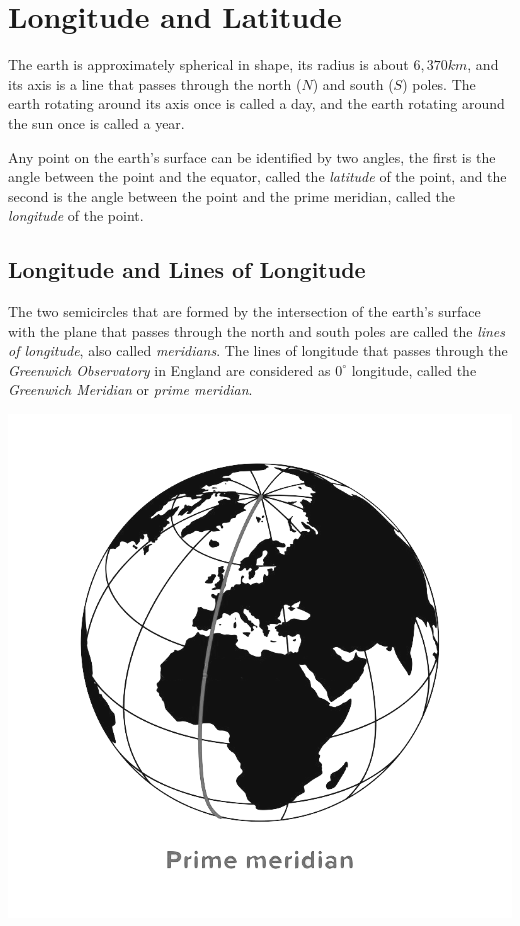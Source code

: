 \documentclass{report}
\begin{document}
\begin{multicols}{2}
\begin{enumerate}
    \end{enumerate}

    \section{Longitude and Latitude}

    The earth is approximately spherical in shape, its radius is about $6,370km$,
    and its axis is a line that passes through the north ({$N$}) and south ($S$)
    poles. The earth rotating around its axis once is called a day, and the earth
    rotating around the sun once is called a year.

    Any point on the earth's surface can be identified by two angles, the first is
    the angle between the point and the equator, called the \emph{latitude} of the
    point, and the second is the angle between the point and the prime meridian,
    called the \emph{longitude} of the point.

    \subsection*{Longitude and Lines of Longitude}

    The two semicircles that are formed by the intersection of the earth's surface
    with the plane that passes through the north and south poles are called the
    \emph{lines of longitude}, also called \emph{meridians}. The lines of longitude
    that passes through the \emph{Greenwich Observatory} in England are considered
    as $0^{\circ}$ longitude, called the \emph{Greenwich Meridian} or \emph{prime
        meridian}.

    \begin{center}
        \includegraphics[scale=0.25]{primemeridian}
    \end{center}


\end{multicols}
\end{document}
